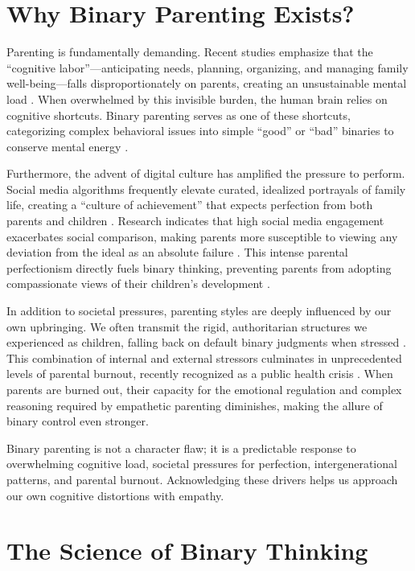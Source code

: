 \section{Why Binary Parenting Exists?}
Parenting is fundamentally demanding.
Recent studies emphasize that the ``cognitive labor''---anticipating needs, planning, organizing, and managing family well-being---falls disproportionately on parents, creating an unsustainable mental load \citep{daminger2024, reichstiebert2023}.
When overwhelmed by this invisible burden, the human brain relies on cognitive shortcuts.
Binary parenting serves as one of these shortcuts, categorizing complex behavioral issues into simple ``good'' or ``bad'' binaries to conserve mental energy \citep{yildiz2023}.

Furthermore, the advent of digital culture has amplified the pressure to perform.
Social media algorithms frequently elevate curated, idealized portrayals of family life, creating a ``culture of achievement'' that expects perfection from both parents and children \citep{gawlik2024}.
Research indicates that high social media engagement exacerbates social comparison, making parents more susceptible to viewing any deviation from the ideal as an absolute failure \citep{coyne2024}.
This intense parental perfectionism directly fuels binary thinking, preventing parents from adopting compassionate views of their children's development \citep{padilla2024, seki2023}.

In addition to societal pressures, parenting styles are deeply influenced by our own upbringing.
We often transmit the rigid, authoritarian structures we experienced as children, falling back on default binary judgments when stressed \citep{wu2024}.
This combination of internal and external stressors culminates in unprecedented levels of parental burnout, recently recognized as a public health crisis \citep{murthy2024}.
When parents are burned out, their capacity for the emotional regulation and complex reasoning required by empathetic parenting diminishes, making the allure of binary control even stronger.

\begin{keyinsight}
Binary parenting is not a character flaw; it is a predictable response to overwhelming cognitive load, societal pressures for perfection, intergenerational patterns, and parental burnout.
Acknowledging these drivers helps us approach our own cognitive distortions with empathy.
\end{keyinsight}

\section{The Science of Binary Thinking}

